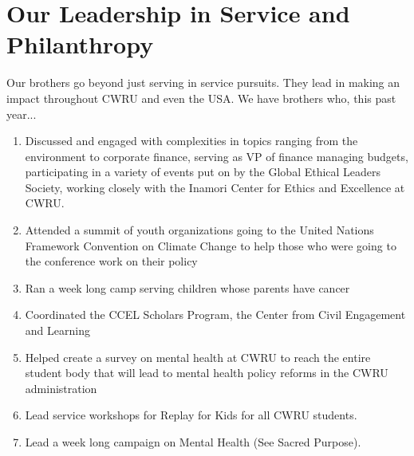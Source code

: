     \section*{Our Leadership in Service and Philanthropy}
      Our brothers go beyond just serving in service pursuits. They lead in making an impact throughout CWRU and even the USA. We have brothers who, this past year...
      
      \begin{enumerate}
	\item Discussed and engaged with complexities in topics ranging from the environment to corporate finance, serving as VP of finance managing budgets, participating in a variety of events put on by the Global Ethical Leaders Society, working closely with the Inamori Center for Ethics and Excellence at CWRU.
      	\item Attended a summit of youth organizations going to the United Nations Framework Convention on Climate Change to help those who were going to the conference work on their policy
      	\item Ran a week long camp serving children whose parents have cancer
      	\item Coordinated the CCEL Scholars Program, the Center from Civil Engagement and Learning
      	\item Helped create a survey on mental health at CWRU to reach the entire student body that will lead to mental health policy reforms in the CWRU administration
      	\item Lead service workshops for Replay for Kids for all CWRU students.
      	\item Lead a week long campaign on Mental Health (See Sacred Purpose).
      \end{enumerate}